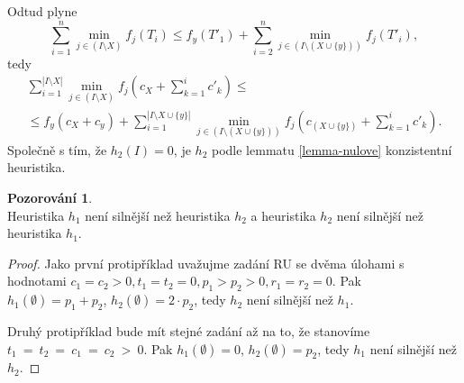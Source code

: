 \documentclass[12pt,notitlepage,fleqn]{report} %
\theoremstyle{definition}
\newtheorem{pozor}[veta]{Pozorování}
\newcommand{\thmpozorone}[1]{\begin{pozor} \n #1 \end{pozor}}
\newcommand{\dukaz}[1]{\begin{proof} #1 \end{proof}}
\def\ent{$\:$}
\def\n{\ent \\}
\newcommand{\suma}[2]{\sum\limits_{#1}^{#2}}
\begin{document}
{%
%       
%          
%      
    Odtud plyne
    \[ \suma{i=1}{n} \min_{j \in (I \setminus X)} f_j(T_i) \leq f_y(T'_1) + \suma{i=2}{n} \min_{j \in (I \setminus (X \cup \{y\}))} f_j(T'_i), \]
    tedy
    \[ \begin{array}{l}
\suma{i=1}{|I \setminus X|} \min_{j \in (I \setminus X)} f_j(c_X + \suma{k=1}{i} c'_k) \leq \\
\leq f_y(c_X + c_y) + \suma{i=1}{|I \setminus X \cup \{y\}|} \min_{j \in (I \setminus (X \cup \{y\}))} f_j(c_{(X \cup \{y\})} + \suma{k=1}{i} c'_k). 
\end{array} \]
    Společně s tím, že $h_2(I)=0$, je $h_2$ podle lemmatu \ref{lemma-nulove} konzistentní heuristika.
    }
    
    \eject
    \thmpozorone{
    Heuristika $h_1$ není silnější než heuristika $h_2$ a heuristika $h_2$ není silnější než heuristika $h_1$.
    }
    \dukaz{
    Jako první protipříklad uvažujme zadání RU se dvěma úlohami s hodnotami
    $c_1 = c_2 > 0, t_1 = t_2 = 0, p_1 > p_2 > 0, r_1 = r_2 = 0$.
    Pak $h_1(\emptyset) = p_1 + p_2$, $h_2(\emptyset) = 2 \cdot p_2$,
    tedy $h_2$ není silnější než $h_1$.

    Druhý protipříklad bude mít stejné zadání až na to, že stanovíme \linebreak $t_1~=~t_2~=~c_1~=~c_2~>~0$. Pak
    $h_1(\emptyset) = 0$,
    $h_2(\emptyset) = p_2$,
    tedy $h_1$ není silnější než $h_2$.
    }
    
\end{document}
